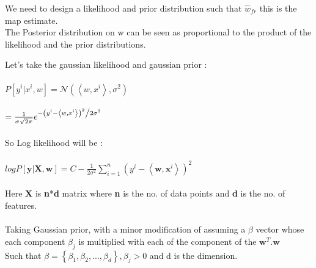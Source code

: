 \documentclass[a4paper,11pt]{article}
\begin{document}
\begin{mlsolution}
We need to design a likelihood and prior distribution such that \begin{math}
\stackrel\frown{w}_{fr} \end{math} this is the map estimate.
\\The Posterior distribution on w can be seen as proportional to the product of the likelihood and the prior distributions.

Let's take the gaussian likelihood and gaussian prior :
\\\\
\begin{math}
P[y^{i}|x^{i}, w] = \mathcal{N} \left ( \left \langle w, x^{i} \right \rangle, \sigma^{2} \right ) 
\end{math}\\ \\
\begin{math}
= \frac{1}{{\sigma \sqrt {2\pi } }}e^{{{ - \left( {y^{i} - \left \langle w, x^{i} \right \rangle } \right)^2 } \mathord{\left/ {\vphantom {{ - \left( {y^{i} - \left \langle w, x^{i} \right \rangle } \right)^2 } {2\sigma ^2 }}} \right. \kern-\nulldelimiterspace} {2\sigma ^2 }}}
\end{math}
\\\\So Log likelihood will be :
\\\\
\begin{math}
log P[\textbf{y} | \textbf{X}, \textbf{w}] = C - \frac{1}{2\sigma^{2}} \sum_{i = 1}^{n} \left ( y^{i} - \left \langle \textbf{w}, \textbf{x}^{i} \right \rangle \right )^{2}
\end{math}\\\\Here \textbf
X
 is \textbf{n}*\textbf{d} matrix where \textbf{n} is the no. of data points and \textbf{d} is the no. of features. \\\\Taking {}Gaussian prior, with a minor modification of assuming a \begin{math} \beta \end{math} vector whose each component \begin{math} \beta_{j} \end{math} is multiplied with each of the component of the \begin{math}\textbf{w}^{T}.\textbf{w}\end{math}
\\
Such that \begin{math} \beta = \left \{ \beta_{1}, \beta_{2}, ..., \beta_{d} \right \} , \beta_{j} > 0\end{math}  and d is the dimension.


\end{mlsolution}
\end{document}
